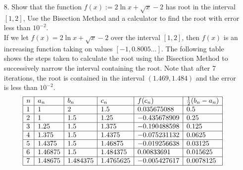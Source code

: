 \documentclass[12pt,letterpaper]{article}
\newcommand{\st}{\ \text{s.t.}\ }
\theoremstyle{case}
\newtheorem{case}{Case}
\theoremstyle{definition}
\begin{document}
\begin{enumerate}
\begin{enumerate}
\begin{proof}
					\begin{case}
						Let $d(0) \neq 0$. Then without loss of generality, assume that $d(0)<0<d(\pi)$. Then since $d$ is continuous on $[0, \pi]$, we have that $[0,\pi] \subset [0,2\pi],\ \exists\ \delta \in [0, \pi] \st d(\delta)=0$.\\
						
						Thus, $d(\delta)=d(\delta + \pi)$, which means that we have found our antipodal points with equal temperature.
					\end{case}
					$\therefore$ We have shown that at any time, there are two points on the earth's equator that have the exact same temperature.
				\end{proof}
				
				\item[8.] Show that the function $f(x):=2\ln x+\sqrt{x}-2$ has root in the interval $[1,2]$, Use the Bisection Method and a calculator to find the root with error less than $10^{-2}$.\\
				
				If we let $f(x)=2\ln x + \sqrt{x}-2$ over the interval $[1,2]$, then $f(x)$ is an increasing function taking on values $[-1,0.8005\dots]$. The following table shows the steps taken to calculate the root using the Bisection Method to successively narrow the interval containing the root. Note that after 7 iterations, the root is contained in the interval $(1.469, 1.484)$ and the error is less than $10^{-2}$.\\
				
				\[\begin{array}{|l|l|l|l|l|l|}
					\hline
					n & a_n & b_n & c_n &f(c_n) & \frac{1}{2}(b_n-a_n) \\
					\hline
					1 & 1 & 2 & 1.5 & 0.035675088 & 0.5 \\
					\hline
					2 & 1 & 1.5 & 1.25 & -0.435678909 & 0.25 \\
					\hline
					3 & 1.25 & 1.5 & 1.375 & -0.190488598 & 0.125 \\
					\hline
					4 & 1.375 & 1.5 & 1.4375 & -0.075231132 & 0.0625 \\
					\hline
					5 & 1.4375 & 1.5 & 1.46875 & -0.019256638 & 0.03125 \\
					\hline
					6 & 1.46875 & 1.5 & 1.484375 & 0.00833691 & 0.015625 \\
					\hline
					7 & 1.48675 & 1.484375 & 1.4765625 & -0.005427617 & 0.0078125\\
					\hline
				\end{array}\]
				

\end{enumerate}
\end{enumerate}
\end{document}
